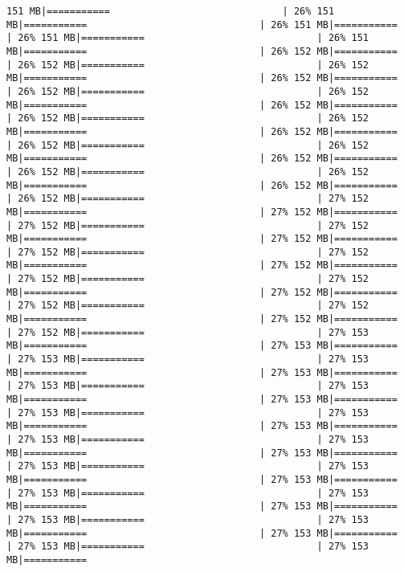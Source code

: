 \documentclass[
]{article}
\begin{document}
\begin{verbatim}
151 MB|===========                              | 26% 151 MB|===========                              | 26% 151 MB|===========                              | 26% 151 MB|===========                              | 26% 151 MB|===========                              | 26% 152 MB|===========                              | 26% 152 MB|===========                              | 26% 152 MB|===========                              | 26% 152 MB|===========                              | 26% 152 MB|===========                              | 26% 152 MB|===========                              | 26% 152 MB|===========                              | 26% 152 MB|===========                              | 26% 152 MB|===========                              | 26% 152 MB|===========                              | 26% 152 MB|===========                              | 26% 152 MB|===========                              | 26% 152 MB|===========                              | 26% 152 MB|===========                              | 26% 152 MB|===========                              | 26% 152 MB|===========                              | 26% 152 MB|===========                              | 27% 152 MB|===========                              | 27% 152 MB|===========                              | 27% 152 MB|===========                              | 27% 152 MB|===========                              | 27% 152 MB|===========                              | 27% 152 MB|===========                              | 27% 152 MB|===========                              | 27% 152 MB|===========                              | 27% 152 MB|===========                              | 27% 152 MB|===========                              | 27% 152 MB|===========                              | 27% 152 MB|===========                              | 27% 152 MB|===========                              | 27% 152 MB|===========                              | 27% 152 MB|===========                              | 27% 153 MB|===========                              | 27% 153 MB|===========                              | 27% 153 MB|===========                              | 27% 153 MB|===========                              | 27% 153 MB|===========                              | 27% 153 MB|===========                              | 27% 153 MB|===========                              | 27% 153 MB|===========                              | 27% 153 MB|===========                              | 27% 153 MB|===========                              | 27% 153 MB|===========                              | 27% 153 MB|===========                              | 27% 153 MB|===========                              | 27% 153 MB|===========                              | 27% 153 MB|===========                              | 27% 153 MB|===========                              | 27% 153 MB|===========                              | 27% 153 MB|===========                              | 27% 153 MB|===========                              | 27% 153 MB|===========                              | 27% 153 MB|===========                              | 27% 153 MB|===========                              | 27% 153 MB|===========                              | 27% 153 MB|===========                              | 27% 153 MB|===========       
\end{verbatim}
\end{document}

